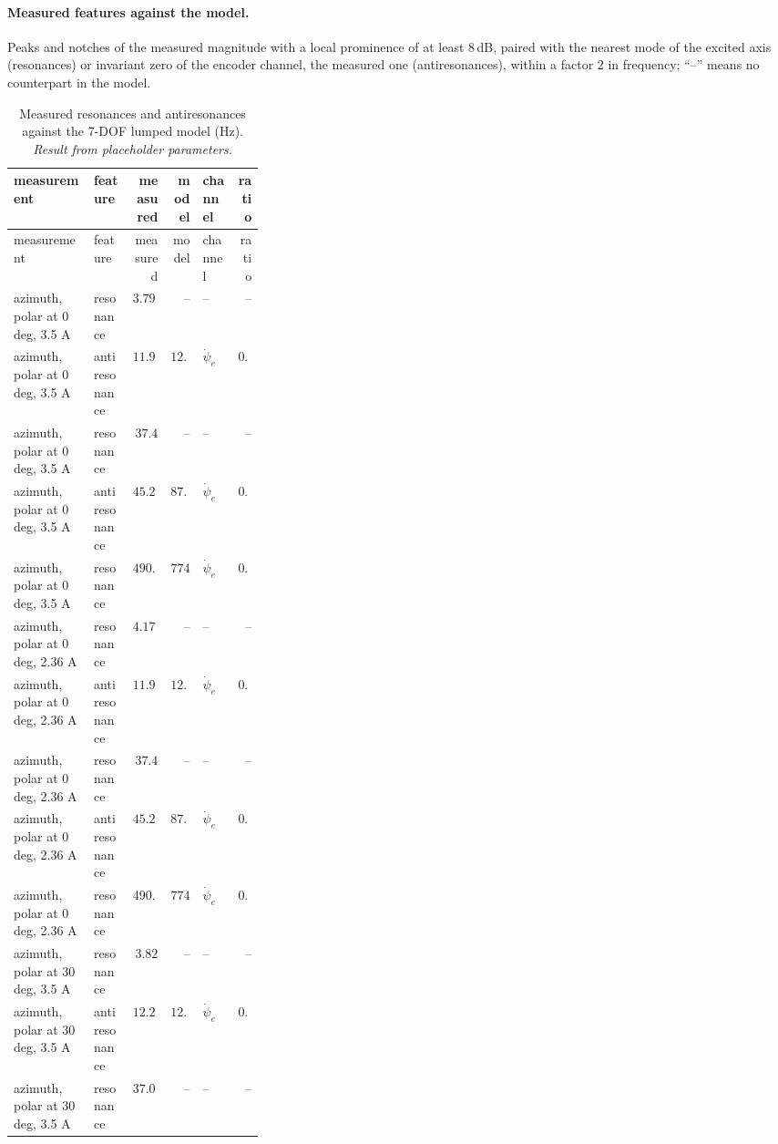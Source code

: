\documentclass[10pt,a4paper]{article}
\numberwithin{equation}{section}
\begin{document}
\paragraph{Measured features against the model.} Peaks and notches of the measured magnitude with a local prominence of at least 8\,dB, paired with the nearest mode of the excited axis (resonances) or invariant zero of the encoder channel, the measured one (antiresonances), within a factor 2 in frequency; ``--'' means no counterpart in the model.
\begin{longtable}{p{0.32\linewidth}lrrlr}
\caption{Measured resonances and antiresonances against the 7-DOF lumped model (Hz). \emph{Result from placeholder parameters.}}\label{tab:exp_features}\\
\toprule measurement & feature & measured & model & channel & ratio \\ \midrule\endfirsthead
\toprule measurement & feature & measured & model & channel & ratio \\ \midrule\endhead
azimuth, polar at 0 deg, 3.5 A & resonance & $3.797$ & -- & -- & -- \\
azimuth, polar at 0 deg, 3.5 A & antiresonance & $11.92$ & $12.38$ & $\dot\psi_e$ & $0.963$ \\
azimuth, polar at 0 deg, 3.5 A & resonance & $37.4$ & -- & -- & -- \\
azimuth, polar at 0 deg, 3.5 A & antiresonance & $45.26$ & $87.54$ & $\dot\psi_e$ & $0.517$ \\
azimuth, polar at 0 deg, 3.5 A & resonance & $490.4$ & $774$ & $\dot\psi_e$ & $0.634$ \\
azimuth, polar at 0 deg, 2.36 A & resonance & $4.177$ & -- & -- & -- \\
azimuth, polar at 0 deg, 2.36 A & antiresonance & $11.92$ & $12.38$ & $\dot\psi_e$ & $0.963$ \\
azimuth, polar at 0 deg, 2.36 A & resonance & $37.4$ & -- & -- & -- \\
azimuth, polar at 0 deg, 2.36 A & antiresonance & $45.26$ & $87.54$ & $\dot\psi_e$ & $0.517$ \\
azimuth, polar at 0 deg, 2.36 A & resonance & $490.4$ & $774$ & $\dot\psi_e$ & $0.634$ \\
azimuth, polar at 30 deg, 3.5 A & resonance & $3.82$ & -- & -- & -- \\
azimuth, polar at 30 deg, 3.5 A & antiresonance & $12.25$ & $12.86$ & $\dot\psi_e$ & $0.953$ \\
azimuth, polar at 30 deg, 3.5 A & resonance & $37.06$ & -- & -- & -- \\

\end{longtable}
\end{document}
